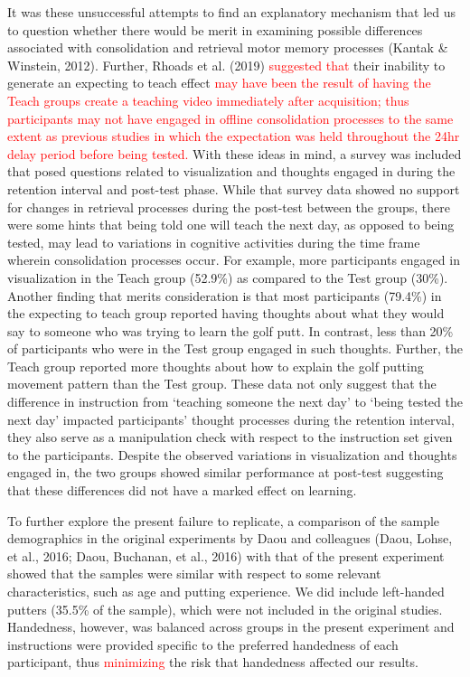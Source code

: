 \documentclass[
  english,
  man,floatsintext]{apa7}
\begin{document}
It was these unsuccessful attempts to find an explanatory mechanism that led us to question whether there would be merit in examining possible differences associated with consolidation and retrieval motor memory processes (Kantak \& Winstein, 2012). Further, Rhoads et al. (2019) \textcolor{red}{suggested that} their inability to generate an expecting to teach effect \textcolor{red}{may have been the result of having the Teach groups create a teaching video immediately after acquisition; thus participants may not have engaged in offline consolidation processes to the same extent as previous studies in which the expectation was held throughout the 24hr delay period before being tested.} With these ideas in mind, a survey was included that posed questions related to visualization and thoughts engaged in during the retention interval and post-test phase. While that survey data showed no support for changes in retrieval processes during the post-test between the groups, there were some hints that being told one will teach the next day, as opposed to being tested, may lead to variations in cognitive activities during the time frame wherein consolidation processes occur. For example, more participants engaged in visualization in the Teach group (52.9\%) as compared to the Test group (30\%). Another finding that merits consideration is that most participants (79.4\%) in the expecting to teach group reported having thoughts about what they would say to someone who was trying to learn the golf putt. In contrast, less than 20\% of participants who were in the Test group engaged in such thoughts. Further, the Teach group reported more thoughts about how to explain the golf putting movement pattern than the Test group. These data not only suggest that the difference in instruction from `teaching someone the next day' to `being tested the next day' impacted participants' thought processes during the retention interval, they also serve as a manipulation check with respect to the instruction set given to the participants. Despite the observed variations in visualization and thoughts engaged in, the two groups showed similar performance at post-test suggesting that these differences did not have a marked effect on learning.

To further explore the present failure to replicate, a comparison of the sample demographics in the original experiments by Daou and colleagues (Daou, Lohse, et al., 2016; Daou, Buchanan, et al., 2016) with that of the present experiment showed that the samples were similar with respect to some relevant characteristics, such as age and putting experience. We did include left-handed putters (35.5\% of the sample), which were not included in the original studies. Handedness, however, was balanced across groups in the present experiment and instructions were provided specific to the preferred handedness of each participant, thus \textcolor{red}{minimizing} the risk that handedness affected our results.
\end{document}
